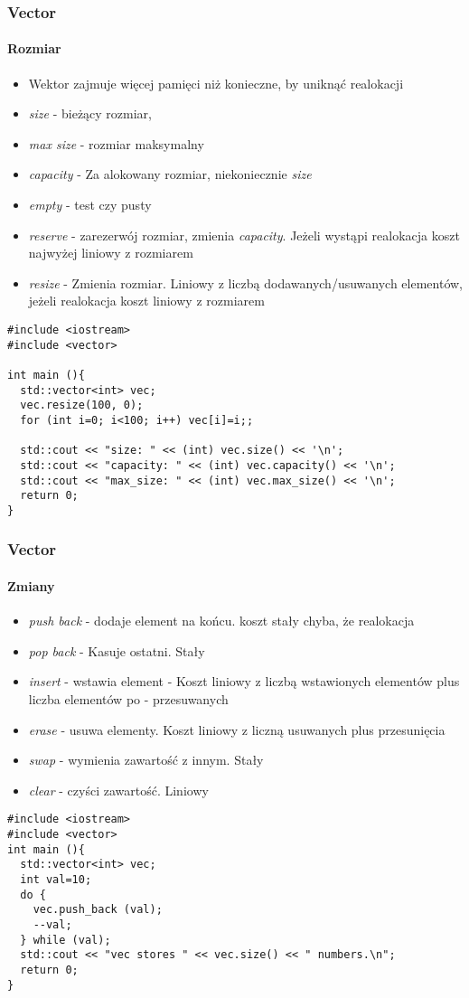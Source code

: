 \documentclass[10pt]{beamer}
\begin{document}
\begin{frame}[fragile]
  \frametitle{Vector}
  \framesubtitle{Rozmiar}
  \begin{itemize}
    \item Wektor zajmuje więcej pamięci niż konieczne, by uniknąć realokacji
    \item \textit{size} - bieżący rozmiar,
    \item \textit{max size} - rozmiar maksymalny
    \item \textit{capacity} - Za alokowany rozmiar, niekoniecznie \textit{size}
    \item \textit{empty} - test czy pusty
    \item \textit{reserve} - zarezerwój rozmiar, zmienia \textit{capacity}.
    Jeżeli wystąpi realokacja koszt najwyżej liniowy z rozmiarem
    \item \textit{resize} - Zmienia rozmiar. Liniowy z liczbą dodawanych/usuwanych elementów,
    jeżeli realokacja koszt liniowy z rozmiarem
  \end{itemize}
  \begin{lstlisting}
#include <iostream>
#include <vector>

int main (){
  std::vector<int> vec;
  vec.resize(100, 0);
  for (int i=0; i<100; i++) vec[i]=i;;

  std::cout << "size: " << (int) vec.size() << '\n';
  std::cout << "capacity: " << (int) vec.capacity() << '\n';
  std::cout << "max_size: " << (int) vec.max_size() << '\n';
  return 0;
}
\end{lstlisting}
\end{frame}

\begin{frame}[fragile]
  \frametitle{Vector}
  \framesubtitle{Zmiany}
  \begin{itemize}
    \item \textit{push back} - dodaje element na końcu. koszt stały chyba, że realokacja
    \item \textit{pop back} - Kasuje ostatni. Stały
    \item \textit{insert} - wstawia element - Koszt liniowy z liczbą wstawionych elementów plus
    liczba elementów po - przesuwanych 
    \item \textit{erase} - usuwa elementy. Koszt liniowy z liczną usuwanych plus przesunięcia
    \item \textit{swap} - wymienia zawartość z innym. Stały
    \item \textit{clear} - czyści zawartość. Liniowy
  \end{itemize}
  \begin{lstlisting}
#include <iostream>
#include <vector>
int main (){
  std::vector<int> vec;
  int val=10;
  do {
    vec.push_back (val);
    --val;
  } while (val);
  std::cout << "vec stores " << vec.size() << " numbers.\n";
  return 0;
}
\end{lstlisting}
\end{frame}
\end{document}
